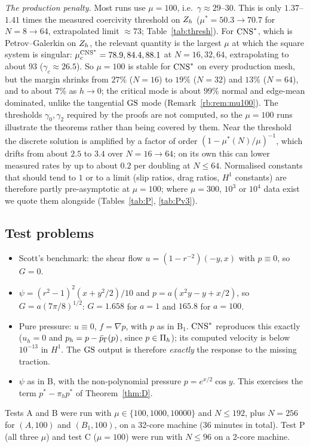 \emph{The production penalty.} Most runs use $\mu=100$, i.e.\ $\gamma\approx29$--$30$. This is only $1.37$--$1.41$ times the measured coercivity threshold on $Z_h$ ($\mu^\ast=50.3\to70.7$ for $N=8\to64$, extrapolated limit $\approx73$; Table~\ref{tab:thresh}). For $\mathrm{CNS}^\ast$, which is Petrov--Galerkin on $Z_h$, the relevant quantity is the largest $\mu$ at which the square system is singular: $\mu_c^{\mathrm{CNS}^\ast}=78.9,84.4,88.1$ at $N=16,32,64$, extrapolating to about $93$ ($\gamma_c\approx26.5$). So $\mu=100$ is stable for $\mathrm{CNS}^\ast$ on every production mesh, but the margin shrinks from $27\%$ ($N=16$) to $19\%$ ($N=32$) and $13\%$ ($N=64$), and to about $7\%$ as $h\to0$; the critical mode is about $99\%$ normal and edge-mean dominated, unlike the tangential $\mathrm{GS}$ mode (Remark~\ref{rb:rem:mu100}). The thresholds $\gamma_0,\gamma_2$ required by the proofs are not computed, so the $\mu=100$ runs illustrate the theorems rather than being covered by them. Near the threshold the discrete solution is amplified by a factor of order $(1-\mu^\ast(N)/\mu)^{-1}$, which drifts from about $2.5$ to $3.4$ over $N=16\to64$; on its own this can lower measured rates by up to about $0.2$ per doubling at $N\le64$. Normalised constants that should tend to $1$ or to a limit (slip ratios, drag ratios, $H^1$ constants) are therefore partly pre-asymptotic at $\mu=100$; where $\mu=300$, $10^3$ or $10^4$ data exist we quote them alongside (Tables~\ref{tab:P}, \ref{tab:Pv3}).

\subsection{Test problems}
\begin{itemize}
\item[\textbf{A}] Scott's benchmark: the shear flow $u=(1-r^{-2})(-y,x)$ with $p\equiv0$, so $G=0$.
\item[\textbf{B$_a$}] $\psi=(r^2-1)^2(x+y^2/2)/10$ and $p=a(x^2y-y+x/2)$, so $G=a(7\pi/8)^{1/2}$: $G=1.658$ for $a=1$ and $165.8$ for $a=100$.
\item[\textbf{P}] Pure pressure: $u\equiv0$, $f=\nabla p$, with $p$ as in B$_1$. $\mathrm{CNS}^\ast$ reproduces this exactly ($u_h=0$ and $p_h=p-\bar p_{\Gamma}(p)$, since $p\in\Pi_h$); its computed velocity is below $10^{-13}$ in $H^1$. The $\mathrm{GS}$ output is therefore \emph{exactly} the response to the missing traction.
\item[\textbf{C}] $\psi$ as in B, with the non-polynomial pressure $p=e^{x/2}\cos y$. This exercises the term $p^\ast-\pi_hp^\ast$ of Theorem~\ref{thm:D}.
\end{itemize}
Tests A and B were run with $\mu\in\{100,1000,10000\}$ and $N\le192$, plus $N=256$ for $(A,100)$ and $(B_1,100)$, on a 32-core machine (36 minutes in total). Test P (all three $\mu$) and test C ($\mu=100$) were run with $N\le96$ on a 2-core machine.

